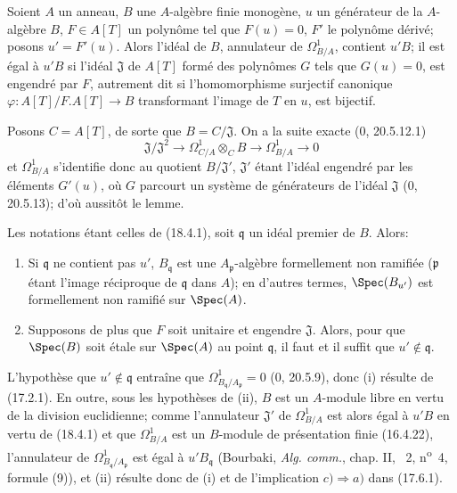 
\begin{lemma}[18.4.1]
\label{IV.18.4.1}
Soient $A$ un anneau, $B$ une $A$-algèbre finie monogène, $u$ un générateur de la $A$-algèbre $B$, $F\in A[T]$ un polynôme tel que $F(u)=0$, $F'$ le polynôme dérivé; posons $u'=F'(u)$. Alors l'idéal de $B$, annulateur de $\Omega^1_{B/A}$, contient $u'B$; il est égal à $u'B$ si l'idéal $\mathfrak J$ de $A[T]$ formé des polynômes $G$ tels que $G(u)=0$, est engendré par $F$, autrement dit si l'homomorphisme surjectif canonique $\varphi:A[T]/F.A[T]\to B$ transformant l'image de $T$ en $u$, est bijectif.
\end{lemma}

Posons $C=A[T]$, de sorte que $B=C/\mathfrak J$. On a la suite exacte (0, 20.5.12.1)
\[
  \mathfrak J/\mathfrak J^2\longrightarrow\Omega^1_{C/A}\otimes_C B\longrightarrow\Omega^1_{B/A}\longrightarrow 0
\]
et $\Omega^1_{B/A}$ s'identifie donc au quotient $B/\mathfrak J'$, $\mathfrak J'$ étant l'idéal engendré par les éléments $G'(u)$, où $G$ parcourt un système de générateurs de l'idéal $\mathfrak J$ (0, 20.5.13); d'où aussitôt le lemme.

\begin{proposition}[18.4.2]
\label{IV.18.4.2}
Les notations étant celles de (18.4.1), soit $\mathfrak q$ un idéal premier de $B$. Alors:
\begin{enumerate}
  \item[(i)] Si $\mathfrak q$ ne contient pas $u'$, $B_{\mathfrak q}$ est une $A_{\mathfrak p}$-algèbre formellement non ramifiée ($\mathfrak p$ étant l'image réciproque de $\mathfrak q$ dans $A$); en d'autres termes, $\Spec(B_{u'})$ est formellement non ramifié sur $\Spec(A)$.
  \item[(ii)] Supposons de plus que $F$ soit unitaire et engendre $\mathfrak J$. Alors, pour que $\Spec(B)$ soit étale sur $\Spec(A)$ au point $\mathfrak q$, il faut et il suffit que $u'\notin\mathfrak q$.
\end{enumerate}
\end{proposition}

L'hypothèse que $u'\notin\mathfrak q$ entraîne que $\Omega^1_{B_{\mathfrak q}/A_{\mathfrak p}}=0$ (0, 20.5.9), donc (i) résulte de (17.2.1). En outre, sous les hypothèses de (ii), $B$ est un $A$-module libre en vertu de la division euclidienne; comme l'annulateur $\mathfrak J'$ de $\Omega^1_{B/A}$ est alors égal à $u'B$ en vertu de (18.4.1) et que $\Omega^1_{B/A}$ est un $B$-module de présentation finie (16.4.22), l'annulateur de $\Omega^1_{B_{\mathfrak q}/A_{\mathfrak p}}$ est égal à $u'B_{\mathfrak q}$ (Bourbaki, \emph{Alg. comm.}, chap. II, \textsection~2, n\textsuperscript{o}~4, formule (9)), et (ii) résulte donc de (i) et de l'implication $c)\Rightarrow a)$ dans (17.6.1).

